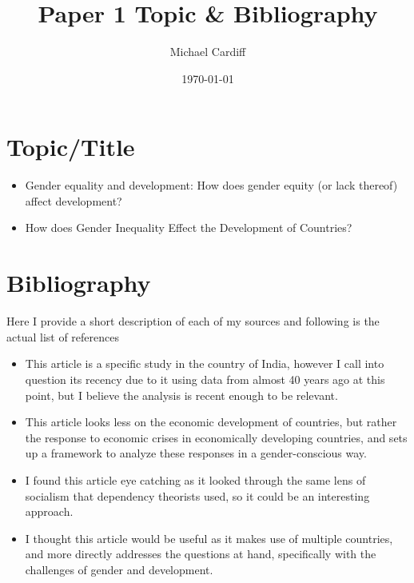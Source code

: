 \documentclass[12pt]{article}
\title{\vspace{-3em}Paper 1 Topic \& Bibliography}
\author{Michael Cardiff}
\date{\today}
\begin{document}
\maketitle
\section{Topic/Title}
\begin{itemize}
\item Gender equality and development:  How does gender equity (or lack thereof) affect development?
\item How does Gender Inequality Effect the Development of Countries? 
\end{itemize}
\section{Bibliography}
Here I provide a short description of each of my sources and following is the actual list of references
\begin{itemize}
\item \cite{bhatt} This article is a specific study in the country of India, however I call into question its recency due to it using data from almost 40 years ago at this point, but I believe the analysis is recent enough to be relevant. 
\item \cite{elson} This article looks less on the economic development of countries, but rather the response to economic crises in economically developing countries, and sets up a framework to analyze these responses in a gender-conscious way. 
\item \cite{foho} I found this article eye catching as it looked through the same lens of socialism that dependency theorists used, so it could be an interesting approach. 
\item \cite{ferrant} I thought this article would be useful as it makes use of multiple countries, and more directly addresses the questions at hand, specifically with the challenges of gender and development. 
\end{itemize}
\newpage

 
\end{document}
